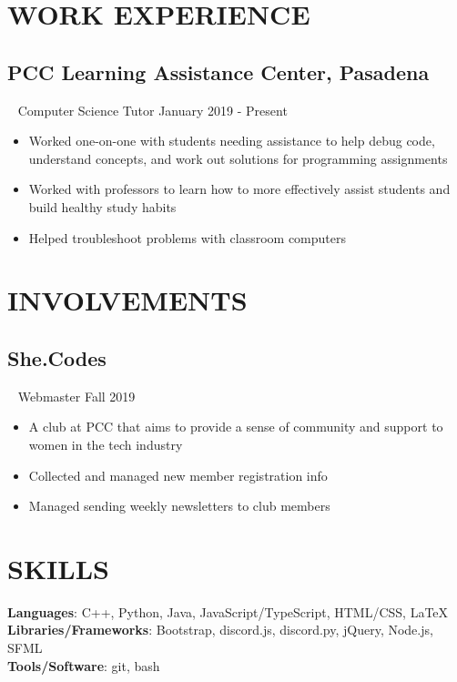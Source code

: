 \documentclass{article}
\newcommand{\resumesection}[3]{
    \subsection*{#1}
    \ 
    \footnotesize
    \textcolor{wordgrey}{#2}
    \normalsize
    \hfill
    \textcolor{wordgrey}{#3}
}
\begin{document}
\section*{WORK EXPERIENCE}
\resumesection{PCC Learning Assistance Center, Pasadena}{Computer Science Tutor}{January 2019 - Present}
\begin{itemize}
    \item Worked one-on-one with students needing assistance to help debug code, understand concepts, and work out solutions for programming assignments
    \item Worked with professors to learn how to more effectively assist students and build healthy study habits
    \item Helped troubleshoot problems with classroom computers
\end{itemize}


\section*{INVOLVEMENTS}
\resumesection{She.Codes}{Webmaster}{Fall 2019}
\begin{itemize}
    \item A club at PCC that aims to provide a sense of community and support to women in the tech industry
    \item Collected and managed new member registration info
    \item Managed sending weekly newsletters to club members    
\end{itemize}


\section*{SKILLS}
\textbf{Languages}: C++, Python, Java, JavaScript/TypeScript, HTML/CSS, {\selectfont\LaTeX}\\
\textbf{Libraries/Frameworks}: Bootstrap, discord.js, discord.py, jQuery, Node.js, SFML\\
\textbf{Tools/Software}: git, bash
\end{document}

